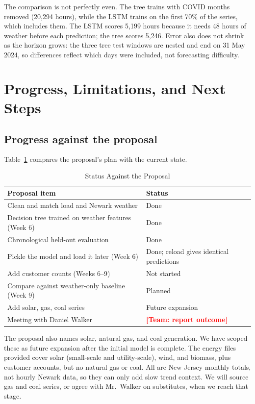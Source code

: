 \documentclass[conference]{IEEEtran}
\newcommand{\todo}[1]{\textcolor{red}{\textbf{[Team: #1]}}}
\begin{document}
The comparison is not perfectly even. The tree trains with COVID months removed (20,294 hours), while the LSTM trains on the first 70\% of the series, which includes them. The LSTM scores 5,199 hours because it needs 48 hours of weather before each prediction; the tree scores 5,246. Error also does not shrink as the horizon grows: the three tree test windows are nested and end on 31 May 2024, so differences reflect which days were included, not forecasting difficulty.

\section{Progress, Limitations, and Next Steps}
\subsection{Progress against the proposal}
Table~\ref{tab:status} compares the proposal's plan with the current state.

\begin{table}[t]
\caption{Status Against the Proposal}
\label{tab:status}
\centering\footnotesize
\setlength{\tabcolsep}{3pt}
\begin{tabular}{@{}p{2.05in}p{1.05in}@{}}
\toprule
Proposal item & Status \\
\midrule
Clean and match load and Newark weather & Done \\
Decision tree trained on weather features (Week 6) & Done \\
Chronological held-out evaluation & Done \\
Pickle the model and load it later (Week 6) & Done; reload gives identical predictions \\
Add customer counts (Weeks 6--9) & Not started \\
Compare against weather-only baseline (Week 9) & Planned \\
Add solar, gas, coal series & Future expansion \\
Meeting with Daniel Walker & \todo{report outcome} \\
\bottomrule
\end{tabular}
\end{table}

The proposal also names solar, natural gas, and coal generation. We have scoped these as future expansion after the initial model is complete. The energy files provided cover solar (small-scale and utility-scale), wind, and biomass, plus customer accounts, but no natural gas or coal. All are New Jersey monthly totals, not hourly Newark data, so they can only add slow trend context. We will source gas and coal series, or agree with Mr.\ Walker on substitutes, when we reach that stage.
\end{document}
